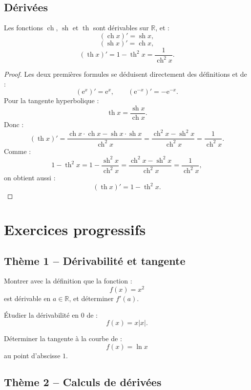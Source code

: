 \documentclass[11pt,a4paper]{article}
\newcommand{\R}{\mathbb R}
\newcommand{\e}{\mathrm e}
\newcommand{\ch}{\operatorname{ch}}
\newcommand{\sh}{\operatorname{sh}}
\renewcommand{\th}{\operatorname{th}}
\begin{document}
\subsection{Dérivées}

\begin{theorembox}
Les fonctions \(\ch\), \(\sh\) et \(\th\) sont dérivables sur \(\R\), et :
\[
(\ch x)'=\sh x,
\]
\[
(\sh x)'=\ch x,
\]
\[
(\th x)'=1-\th^2 x=\frac1{\ch^2 x}.
\]
\end{theorembox}

\begin{proof}
Les deux premières formules se déduisent directement des définitions et de :
\[
(\e^x)'=\e^x,
\qquad
(\e^{-x})'=-\e^{-x}.
\]
Pour la tangente hyperbolique :
\[
\th x=\frac{\sh x}{\ch x}.
\]
Donc :
\[
(\th x)'=
\frac{\ch x\cdot\ch x-\sh x\cdot\sh x}{\ch^2 x}
=
\frac{\ch^2 x-\sh^2 x}{\ch^2 x}
=
\frac1{\ch^2 x}.
\]
Comme :
\[
1-\th^2 x
=
1-\frac{\sh^2 x}{\ch^2 x}
=
\frac{\ch^2 x-\sh^2 x}{\ch^2 x}
=
\frac1{\ch^2 x},
\]
on obtient aussi :
\[
(\th x)'=1-\th^2 x.
\]
\end{proof}

\newpage
\section{Exercices progressifs}

\subsection*{Thème 1 -- Dérivabilité et tangente}

\begin{exercicebox}[1]
Montrer avec la définition que la fonction :
\[
f(x)=x^2
\]
est dérivable en \(a\in\R\), et déterminer \(f'(a)\).
\end{exercicebox}

\begin{exercicebox}[2]
Étudier la dérivabilité en \(0\) de :
\[
f(x)=x|x|.
\]
\end{exercicebox}

\begin{exercicebox}[3]
Déterminer la tangente à la courbe de :
\[
f(x)=\ln x
\]
au point d'abscisse \(1\).
\end{exercicebox}

\subsection*{Thème 2 -- Calculs de dérivées}
\end{document}
